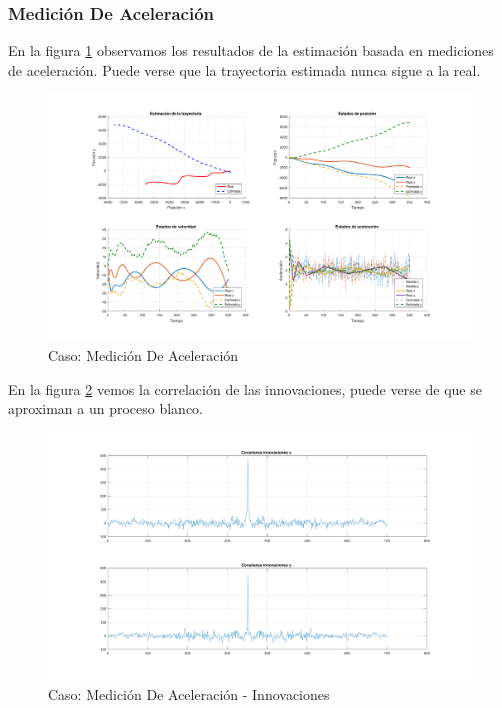 		\subsubsection{Medición De Aceleración}
		
		En la figura \ref{fig:ej2c} observamos los resultados de la estimación basada en mediciones de aceleración. Puede verse que la trayectoria estimada nunca sigue a la real.
		
		\begin{figure}[H]
			\centering
			\includegraphics[width=1.0\textwidth,keepaspectratio]{Figuras/graf_ej2c.pdf}
			\caption{Caso: Medición De Aceleración}
			\label{fig:ej2c}
		\end{figure}
		
		En la figura \ref{fig:ej2c_innov} vemos la correlación de las innovaciones, puede verse de que se aproximan a un proceso blanco.
		
		\begin{figure}[H]
			\centering
			\includegraphics[width=1.0\textwidth,keepaspectratio]{Figuras/covinn_ej2c.pdf}
			\caption{Caso: Medición De Aceleración - Innovaciones}
			\label{fig:ej2c_innov}
		\end{figure}

